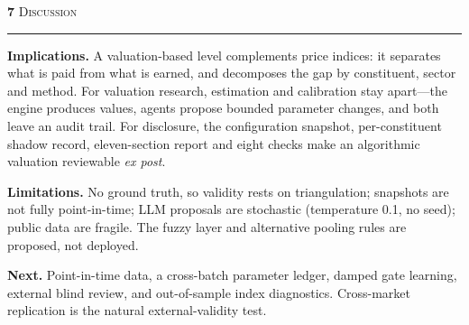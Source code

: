 \documentclass[10pt]{article}
\newcommand{\sectnumfont}{\fontsize{33}{35}\selectfont\bfseries}
\newcommand{\secttitlefont}{\fontsize{31}{35}\selectfont\scshape\addfontfeatures{LetterSpace=6}}
\newcommand{\postersection}[2]{%
  \par\vspace{10.2mm}%
  \noindent
  {\color{burgundy}\sectnumfont #1}\hspace{5mm}%
  {\color{oxford}\secttitlefont #2}\par
  \vspace{2.2mm}%
  {\color{gold}\rule{\linewidth}{0.55pt}}\par
  \vspace{3.4mm}%
}
\begin{document}
\begin{minipage}[t]{385.5mm}
\postersection{7}{Discussion}
\textbf{Implications.} A valuation-based level complements price indices: it
separates what is paid from what is earned, and decomposes the gap by
constituent, sector and method. For valuation research, estimation and
calibration stay apart---the engine produces values, agents propose bounded
parameter changes, and both leave an audit trail. For disclosure, the
configuration snapshot, per-constituent shadow record, eleven-section report and
eight checks make an algorithmic valuation reviewable \textit{ex post}.

\textbf{Limitations.} No ground truth, so validity rests on triangulation;
snapshots are not fully point-in-time; LLM proposals are stochastic
(temperature 0.1, no seed); public data are fragile. The fuzzy layer and
alternative pooling rules are proposed, not deployed.

\textbf{Next.} Point-in-time data, a cross-batch parameter ledger, damped gate
learning, external blind review, and out-of-sample index diagnostics.
Cross-market replication is the natural external-validity test.

\end{minipage}
\par
\end{document}
